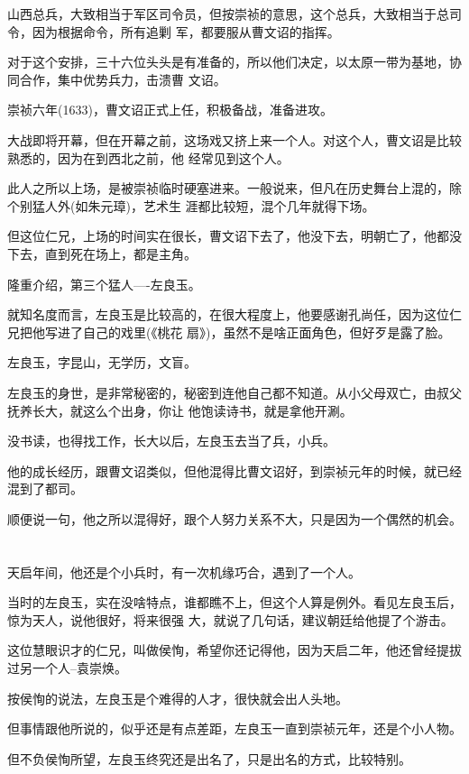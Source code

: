 \documentclass[11pt,a4paper,onecolumn]{article}
\begin{document}
山西总兵，大致相当于军区司令员，但按崇祯的意思，这个总兵，大致相当于总司令，因为根据命令，所有追剿
军，都要服从曹文诏的指挥。

对于这个安排，三十六位头头是有准备的，所以他们决定，以太原一带为基地，协同合作，集中优势兵力，击溃曹
文诏。

崇祯六年(1633)，曹文诏正式上任，积极备战，准备进攻。

大战即将开幕，但在开幕之前，这场戏又挤上来一个人。对这个人，曹文诏是比较熟悉的，因为在到西北之前，他
经常见到这个人。

此人之所以上场，是被崇祯临时硬塞进来。一般说来，但凡在历史舞台上混的，除个别猛人外(如朱元璋)，艺术生
涯都比较短，混个几年就得下场。

但这位仁兄，上场的时间实在很长，曹文诏下去了，他没下去，明朝亡了，他都没下去，直到死在场上，都是主角。

隆重介绍，第三个猛人----左良玉。

就知名度而言，左良玉是比较高的，在很大程度上，他要感谢孔尚任，因为这位仁兄把他写进了自己的戏里(《桃花
扇》)，虽然不是啥正面角色，但好歹是露了脸。

左良玉，字昆山，无学历，文盲。

左良玉的身世，是非常秘密的，秘密到连他自己都不知道。从小父母双亡，由叔父抚养长大，就这么个出身，你让
他饱读诗书，就是拿他开涮。

没书读，也得找工作，长大以后，左良玉去当了兵，小兵。

他的成长经历，跟曹文诏类似，但他混得比曹文诏好，到崇祯元年的时候，就已经混到了都司。

顺便说一句，他之所以混得好，跟个人努力关系不大，只是因为一个偶然的机会。

\section[\thesection]{}

天启年间，他还是个小兵时，有一次机缘巧合，遇到了一个人。

当时的左良玉，实在没啥特点，谁都瞧不上，但这个人算是例外。看见左良玉后，惊为天人，说他很好，将来很强
大，就说了几句话，建议朝廷给他提了个游击。

这位慧眼识才的仁兄，叫做侯恂，希望你还记得他，因为天启二年，他还曾经提拔过另一个人--袁崇焕。

按侯恂的说法，左良玉是个难得的人才，很快就会出人头地。

但事情跟他所说的，似乎还是有点差距，左良玉一直到崇祯元年，还是个小人物。

但不负侯恂所望，左良玉终究还是出名了，只是出名的方式，比较特别。
\end{document}
